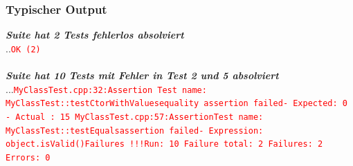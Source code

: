 \begin{multicols}{2}
\subsubsection{Typischer Output}
\footnotesize{
	\textbf{\textit{Suite hat 2 Tests fehlerlos absolviert}}\\
	..\newline \textcolor{red}{\texttt{OK (2)}}\\\\
	\textbf{\textit{Suite hat 10 Tests mit Fehler in Test 2 und 5 absolviert}} \\ 
	...\newline \textcolor{red}{\texttt{MyClassTest.cpp:32:Assertion \newline Test name: MyClassTest::testCtorWithValues\newline equality assertion failed\newline - Expected: 0 \newline - Actual : 15 \newline \newline MyClassTest.cpp:57:Assertion\newline Test name: MyClassTest::testEquals\newline assertion failed\newline - Expression: object.isValid()\newline \newline Failures !!!\newline Run: 10 \qquad Failure total: 2 \qquad Failures: 2 \qquad Errors: 0}}}
\end{multicols}